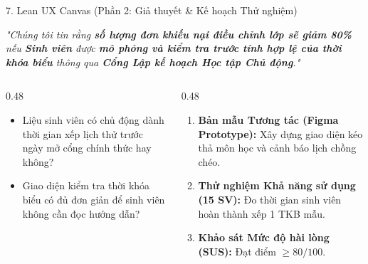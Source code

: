 \documentclass[aspectratio=169, 10pt]{beamer}
\begin{document}
\begin{frame}{7. Lean UX Canvas (Phần 2: Giả thuyết \& Kế hoạch Thử nghiệm)}
    \begin{tcolorbox}[colback=PrimaryBlue!5, colframe=PrimaryBlue, title=Box 6: Giả thuyết Cốt lõi (Core Hypothesis)]
        \small
        \textit{"Chúng tôi tin rằng \textbf{số lượng đơn khiếu nại điều chỉnh lớp sẽ giảm 80\%} nếu \textbf{Sinh viên} được \textbf{mô phỏng và kiểm tra trước tính hợp lệ của thời khóa biểu} thông qua \textbf{Cổng Lập kế hoạch Học tập Chủ động}."}
    \end{tcolorbox}
    
    \vspace{0.15cm}
    
    \begin{columns}[T]
        \begin{column}{0.48\textwidth}
            \begin{tcolorbox}[colback=CardBg, colframe=WarmAmber, title=Box 7: Rủi ro Lớn nhất Cần học Trước]
                \footnotesize
                \begin{itemize}
                    \item Liệu sinh viên có chủ động dành thời gian xếp lịch thử trước ngày mở cổng chính thức hay không?
                    \item Giao diện kiểm tra thời khóa biểu có đủ đơn giản để sinh viên không cần đọc hướng dẫn?
                \end{itemize}
            \end{tcolorbox}
        \end{column}
        
        \begin{column}{0.48\textwidth}
            \begin{tcolorbox}[colback=CardBg, colframe=SoftTeal, title=Box 8: Kế hoạch Thử nghiệm MVP Ít Tốn Công]
                \footnotesize
                \begin{enumerate}
                    \item \textbf{Bản mẫu Tương tác (Figma Prototype):} Xây dựng giao diện kéo thả môn học và cảnh báo lịch chồng chéo.
                    \item \textbf{Thử nghiệm Khả năng sử dụng (15 SV):} Đo thời gian sinh viên hoàn thành xếp 1 TKB mẫu.
                    \item \textbf{Khảo sát Mức độ hài lòng (SUS):} Đạt điểm $\ge 80/100$.
                \end{enumerate}
            \end{tcolorbox}
        \end{column}
    \end{columns}
\end{frame}
\end{document}
